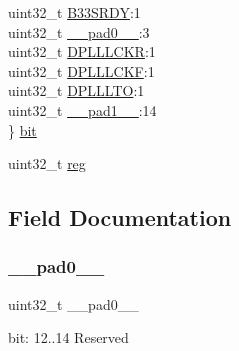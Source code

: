 \begin{DoxyCompactItemize}
\begin{tabbing}
\>uint32\_t \mbox{\hyperlink{union_s_y_s_c_t_r_l___p_c_l_k_s_r___type_a001eb8c699a22ed1e8addd422b0068ae}{B33SRDY}}:1\\
\>uint32\_t \mbox{\hyperlink{union_s_y_s_c_t_r_l___p_c_l_k_s_r___type_a3e57c2ef1c3ffb36722f000cc1156824}{\_\_pad0\_\_}}:3\\
\>uint32\_t \mbox{\hyperlink{union_s_y_s_c_t_r_l___p_c_l_k_s_r___type_a0971d1b5df18859d93257da5c619eb64}{DPLLLCKR}}:1\\
\>uint32\_t \mbox{\hyperlink{union_s_y_s_c_t_r_l___p_c_l_k_s_r___type_ab73a8dbca12f32aad2cc241099afc49f}{DPLLLCKF}}:1\\
\>uint32\_t \mbox{\hyperlink{union_s_y_s_c_t_r_l___p_c_l_k_s_r___type_ac0397fe777ae420afce8c8ddc23dc843}{DPLLLTO}}:1\\
\>uint32\_t \mbox{\hyperlink{union_s_y_s_c_t_r_l___p_c_l_k_s_r___type_a6712ba6dd1d5b43d2d56ff8ac4e275a7}{\_\_pad1\_\_}}:14\\
\} \mbox{\hyperlink{union_s_y_s_c_t_r_l___p_c_l_k_s_r___type_a6982f4c2b348e20dc1b6f5ed34af1a69}{bit}}\\

\end{tabbing}\item 
uint32\+\_\+t \mbox{\hyperlink{union_s_y_s_c_t_r_l___p_c_l_k_s_r___type_a6b91636401516a477989a336376d7b40}{reg}}
\end{DoxyCompactItemize}


\subsection{Field Documentation}
\mbox{\label{union_s_y_s_c_t_r_l___p_c_l_k_s_r___type_a3e57c2ef1c3ffb36722f000cc1156824}} 
\subsubsection{\texorpdfstring{\_\_pad0\_\_}{\_\_pad0\_\_}}
{\footnotesize\ttfamily uint32\+\_\+t \+\_\+\+\_\+pad0\+\_\+\+\_\+}

bit\+: 12..14 Reserved \mbox{\label{union_s_y_s_c_t_r_l___p_c_l_k_s_r___type_a6712ba6dd1d5b43d2d56ff8ac4e275a7}} 
